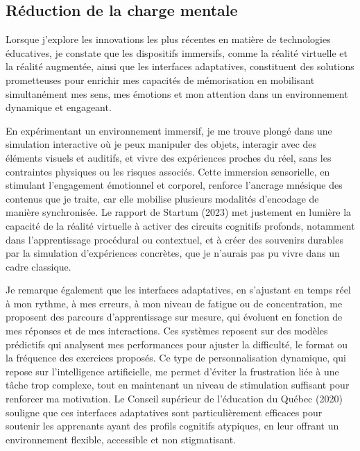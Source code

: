 \documentclass[11pt,a4paper]{report}
\begin{document}
\subsection{Réduction de la charge mentale}

Lorsque j’explore les innovations les plus récentes en matière de technologies éducatives, je constate que les dispositifs immersifs, comme la réalité virtuelle et la réalité augmentée, ainsi que les interfaces adaptatives, constituent des solutions prometteuses pour enrichir mes capacités de mémorisation en mobilisant simultanément mes sens, mes émotions et mon attention dans un environnement dynamique et engageant.

En expérimentant un environnement immersif, je me trouve plongé dans une simulation interactive où je peux manipuler des objets, interagir avec des éléments visuels et auditifs, et vivre des expériences proches du réel, sans les contraintes physiques ou les risques associés. Cette immersion sensorielle, en stimulant l’engagement émotionnel et corporel, renforce l’ancrage mnésique des contenus que je traite, car elle mobilise plusieurs modalités d’encodage de manière synchronisée. Le rapport de Startum (2023) met justement en lumière la capacité de la réalité virtuelle à activer des circuits cognitifs profonds, notamment dans l’apprentissage procédural ou contextuel, et à créer des souvenirs durables par la simulation d’expériences concrètes, que je n’aurais pas pu vivre dans un cadre classique.

Je remarque également que les interfaces adaptatives, en s’ajustant en temps réel à mon rythme, à mes erreurs, à mon niveau de fatigue ou de concentration, me proposent des parcours d’apprentissage sur mesure, qui évoluent en fonction de mes réponses et de mes interactions. Ces systèmes reposent sur des modèles prédictifs qui analysent mes performances pour ajuster la difficulté, le format ou la fréquence des exercices proposés. Ce type de personnalisation dynamique, qui repose sur l’intelligence artificielle, me permet d’éviter la frustration liée à une tâche trop complexe, tout en maintenant un niveau de stimulation suffisant pour renforcer ma motivation. Le Conseil supérieur de l’éducation du Québec (2020) souligne que ces interfaces adaptatives sont particulièrement efficaces pour soutenir les apprenants ayant des profils cognitifs atypiques, en leur offrant un environnement flexible, accessible et non stigmatisant.
\end{document}
